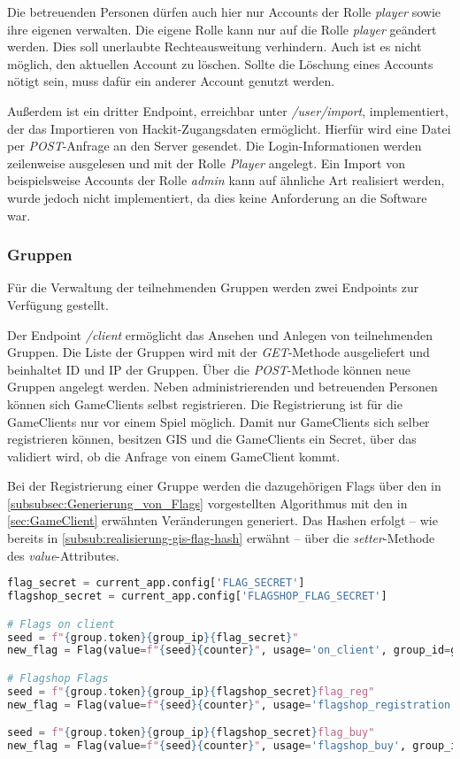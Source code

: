 Die betreuenden Personen dürfen auch hier nur Accounts der Rolle \textit{player} sowie ihre eigenen verwalten. Die eigene Rolle kann nur auf die Rolle \textit{player} geändert werden. Dies soll unerlaubte Rechteausweitung verhindern. Auch ist es nicht möglich, den aktuellen Account zu löschen. Sollte die Löschung eines Accounts nötigt sein, muss dafür ein anderer Account genutzt werden.

Außerdem ist ein dritter Endpoint, erreichbar unter \textit{/user/import}, implementiert, der das Importieren von Hackit-Zugangsdaten ermöglicht. Hierfür wird eine Datei per \textit{POST}-Anfrage an den Server gesendet. Die Login-Informationen werden zeilenweise ausgelesen und mit der Rolle \textit{Player} angelegt. Ein Import von beispielsweise Accounts der Rolle \textit{admin} kann auf ähnliche Art realisiert werden, wurde jedoch nicht implementiert, da dies keine Anforderung an die Software war.

\subsubsection{Gruppen}
Für die Verwaltung der teilnehmenden Gruppen werden zwei Endpoints zur Verfügung \linebreak gestellt.

Der Endpoint \textit{/client} ermöglicht das Ansehen und Anlegen von teilnehmenden Gruppen.
Die Liste der Gruppen wird mit der \textit{GET}-Methode ausgeliefert und beinhaltet ID und IP der Gruppen. Über die \textit{POST}-Methode können neue Gruppen angelegt werden. Neben administrierenden und betreuenden Personen können sich GameClients selbst registrieren. Die Registrierung ist für die GameClients nur vor einem Spiel möglich. Damit nur GameClients sich selber registrieren können, besitzen GIS und die GameClients ein Secret, über das validiert wird, ob die Anfrage von einem GameClient kommt.

Bei der Registrierung einer Gruppe werden die dazugehörigen Flags über den in \autoref{subsubsec:Generierung_von_Flags} vorgestellten Algorithmus mit den in \autoref{sec:GameClient} erwähnten Veränderungen generiert. Das Hashen erfolgt -- wie bereits in \autoref{subsub:realisierung-gis-flag-hash} erwähnt -- über die \textit{setter}-Methode des \textit{value}-Attributes.

\begin{lstlisting}[language=Python, frame=single, caption={GIS Flaggenerierung}, captionpos=b, label={lst:gis-flag-gen}]
flag_secret = current_app.config['FLAG_SECRET']
flagshop_secret = current_app.config['FLAGSHOP_FLAG_SECRET']

# Flags on client
seed = f"{group.token}{group_ip}{flag_secret}"
new_flag = Flag(value=f"{seed}{counter}", usage='on_client', group_id=group.id)

# Flagshop Flags
seed = f"{group.token}{group_ip}{flagshop_secret}flag_reg"
new_flag = Flag(value=f"{seed}{counter}", usage='flagshop_registration', group_id=group.id)

seed = f"{group.token}{group_ip}{flagshop_secret}flag_buy"
new_flag = Flag(value=f"{seed}{counter}", usage='flagshop_buy', group_id=group.id)
\end{lstlisting}

